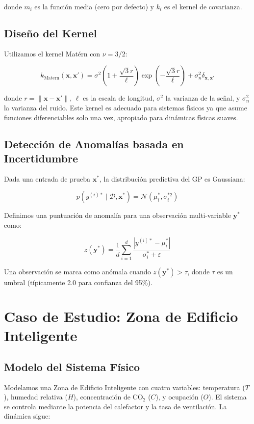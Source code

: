 \documentclass[conference]{IEEEtran}
\begin{document}
donde $m_i$ es la función media (cero por defecto) y $k_i$ es el kernel de covarianza.

\subsection{Diseño del Kernel}
Utilizamos el kernel Matérn con $\nu = 3/2$:

\begin{equation}
k_{\text{Matern}}(\mathbf{x}, \mathbf{x}') = \sigma^2 \left(1 + \frac{\sqrt{3}r}{\ell}\right) \exp\left(-\frac{\sqrt{3}r}{\ell}\right) + \sigma_n^2 \delta_{\mathbf{x},\mathbf{x}'}
\label{eq:matern}
\end{equation}

donde $r = \|\mathbf{x} - \mathbf{x}'\|$, $\ell$ es la escala de longitud, $\sigma^2$ la varianza de la señal, y $\sigma_n^2$ la varianza del ruido. Este kernel es adecuado para sistemas físicos ya que asume funciones diferenciables solo una vez, apropiado para dinámicas físicas suaves.

\subsection{Detección de Anomalías basada en Incertidumbre}
Dada una entrada de prueba $\mathbf{x}^*$, la distribución predictiva del GP es Gaussiana:

\begin{equation}
p(y^{(i)*} \mid \mathcal{D}, \mathbf{x}^*) = \mathcal{N}(\mu_i^*, \sigma_i^{*2})
\label{eq:pred}
\end{equation}

Definimos una puntuación de anomalía para una observación multi-variable $\mathbf{y}^*$ como:

\begin{equation}
z(\mathbf{y}^*) = \frac{1}{d} \sum_{i=1}^d \frac{|y^{(i)*} - \mu_i^*|}{\sigma_i^* + \varepsilon}
\label{eq:score_anomalia}
\end{equation}

Una observación se marca como anómala cuando $z(\mathbf{y}^*) > \tau$, donde $\tau$ es un umbral (típicamente 2.0 para confianza del 95\%).

\section{Caso de Estudio: Zona de Edificio Inteligente}
\label{sec:caso}

\subsection{Modelo del Sistema Físico}
Modelamos una Zona de Edificio Inteligente con cuatro variables: temperatura ($T$), humedad relativa ($H$), concentración de CO$_2$ ($C$), y ocupación ($O$). El sistema se controla mediante la potencia del calefactor y la tasa de ventilación. La dinámica sigue:
\end{document}

